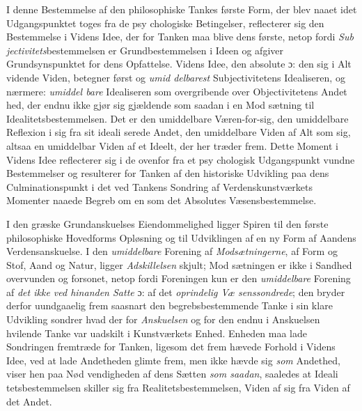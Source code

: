 I denne Bestemmelse af den philosophiske Tankes første
Form, der blev naaet idet Udgangspunktet toges fra de psy\-%
chologiske Betingelser, reflecterer sig den Bestemmelse i Videns
Idee, der for Tanken maa blive dens første, netop fordi \emph{Sub\-%
jectivitets}bestemmelsen er Grundbestemmelsen i Ideen og
afgiver Grundsynspunktet for dens Opfattelse. Videns Idee, den
absolute ɔ: den sig i Alt vidende Viden, betegner først og \emph{umid\-%
delbarest} Subjectivitetens Idealiseren, og nærmere: \emph{umiddel\-%
bare} Idealiseren som overgribende over Objectivitetens Andet\-%
hed, der endnu ikke gjør sig gjældende som saadan i en Mod\-%
sætning til Idealitetsbestemmelsen. Det er den umiddelbare
Væren-for-sig, den umiddelbare Reflexion i sig fra sit ideali\-%
serede Andet, den umiddelbare Viden af Alt som sig, altsaa en
umiddelbar Viden af et Ideelt, der her træder frem. Dette
Moment i Videns Idee reflecterer sig i de ovenfor fra et psy\-%
chologisk Udgangspunkt vundne Bestemmelser og resulterer for
Tanken af den historiske Udvikling paa dens Culminationspunkt
i det ved Tankens Sondring af Verdenskunstværkets Momenter
naaede Begreb om en  som det Absolutes
Væsensbestemmelse.

I den græske Grundanskuelses Eiendommelighed ligger
Spiren til den første philosophiske Hovedforms Opløsning og
til Udviklingen af en ny Form af Aandens Verdensanskuelse.
I den \emph{umiddelbare} Forening af \emph{Modsætningerne}, af Form
og Stof, Aand og Natur, ligger \emph{Adskillelsen} skjult; Mod\-%
sætningen er ikke i Sandhed overvunden og forsonet, netop
fordi Foreningen kun er den \emph{umiddelbare} Forening af \emph{det
ikke ved hinanden Satte} ɔ: af det \emph{oprindelig Væ\-%
senssondrede}; den bryder derfor uundgaaelig frem saasnart
den begrebsbestemmende Tanke i sin klare Udvikling sondrer
hvad der for \emph{Anskuelsen} og for den endnu i Anskuelsen
hvilende Tanke var uadskilt i Kunstværkets Enhed. Enheden
maa lade Sondringen fremtræde for Tanken, ligesom det frem\-%
hævede Forhold i Videns Idee, ved at lade Andetheden glimte
frem, men ikke hævde sig \emph{som} Andethed, viser hen paa Nød\-%
vendigheden af dens Sætten \emph{som saadan}, saaledes at Ideali\-%
tetsbestemmelsen skiller sig fra Realitetsbestemmelsen, Viden
af sig fra Viden af det Andet.

